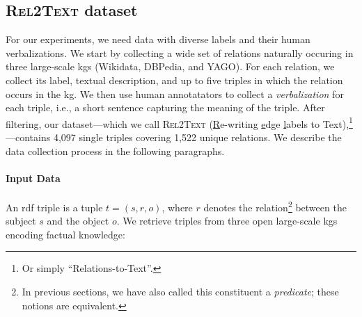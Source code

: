 % 









\subsection{\textsc{Rel2Text} dataset}
\label{sec:rel2text:data}
For our experiments, we need data with diverse labels and their human verbalizations. We start by collecting a wide set of relations naturally occuring in three large-scale \acp{kg} (Wikidata, DBPedia, and YAGO). For each relation, we collect its label, textual description, and up to five triples in which the relation occurs in the \ac{kg}. We then use human annotatators to collect a \emph{verbalization} for each triple, i.e., a short sentence capturing the meaning of the triple. After filtering, our dataset---which we call \textsc{Rel2Text} (\underline{R}e-writing \underline{e}dge \underline{l}abels to Text),\footnote{Or simply ``Relations-to-Text''.}---contains 4,097 single triples covering 1,522 unique relations. We describe the data collection process in the following paragraphs.


\paragraph{Input Data}
An \acs{rdf} triple is a tuple $t = (s, r, o)$, where $r$ denotes the relation\footnote{In previous sections, we have also called this constituent a \emph{predicate}; these notions are equivalent.} between the subject $s$ and the object $o$.
We retrieve triples from three open large-scale \acp{kg} encoding factual knowledge:

